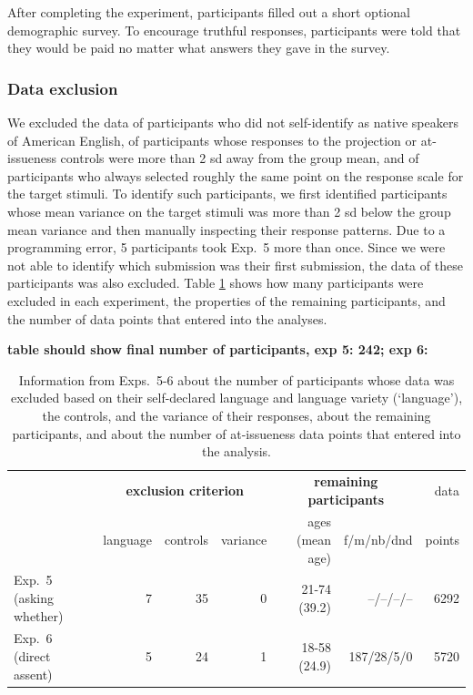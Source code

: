 \documentclass[times,linguex,xcolor]{glossa}
\begin{document}
   After completing the experiment, participants filled out a short optional demographic survey. To encourage truthful responses, participants were told that they would be paid no matter what answers they gave in the survey.

    \subsubsection{Data exclusion}
    
  We excluded the data of participants who did not self-identify as native speakers of American
  English, of participants whose responses to the projection or at-issueness controls were more than 2 sd away from the group mean, and of participants who always selected roughly the same point on the response scale for the target stimuli. To identify such participants, we first identified participants whose mean variance on the target stimuli was more than 2 sd below the group mean variance and then manually inspecting their response patterns. Due to a programming error, 5 participants took Exp.~5 more than once. Since we were not able to identify which submission was their first submission, the data of these participants was also excluded. Table \ref{t:excluded2} shows how many participants were excluded in each experiment, the properties of the remaining participants, and the number of data points that entered into the analyses.

  {\bf table should show final number of participants, exp 5: 242; exp 6: }
    
  \begin{table}[h!]
    \centering
    \begin{tabular}{l | r r r | r r  | r }
                 & \multicolumn{3}{c|}{\bf exclusion criterion} & \multicolumn{2}{c|}{\bf remaining participants} & data \\ 
                & language & controls & variance & ages (mean age) & f/m/nb/dnd &  points \\ \hline
    Exp.~5 (asking whether)  & 7 &  35 & 0 &  21-74 (39.2) & --/--/--/-- & 6292 \\ 
    Exp.~6 (direct assent) &  5 &  24 & 1 & 18-58 (24.9) & 187/28/5/0 & 5720 \\ 
    \hline
    \end{tabular}
    \caption{Information from Exps.~5-6 about the number of participants whose data was excluded based on their self-declared language and language variety (`language'), the controls, and the variance of their responses, about the remaining participants, and about the number of at-issueness data points that entered into the analysis.}\label{t:excluded2}
    \end{table}
\end{document}
